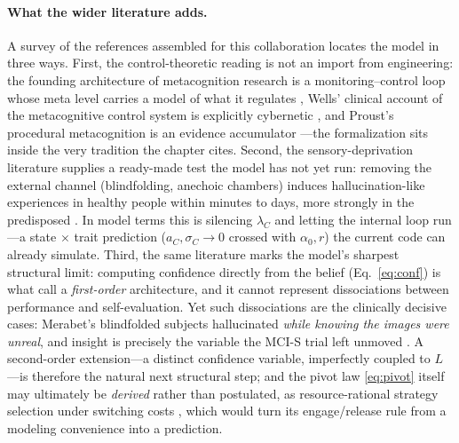 \documentclass[11pt]{article}
\begin{document}
\paragraph{What the wider literature adds.} A survey of the references assembled for this collaboration locates the model in three ways. First, the control-theoretic reading is not an import from engineering: the founding architecture of metacognition research is a monitoring--control loop whose meta level carries a model of what it regulates \citep{NelsonNarens1990, ConantAshby1970}, Wells' clinical account of the metacognitive control system is explicitly cybernetic \citep{Wells2019}, and Proust's procedural metacognition is an evidence accumulator \citep{Proust2012}---the formalization sits inside the very tradition the chapter cites. Second, the sensory-deprivation literature supplies a ready-made test the model has not yet run: removing the external channel (blindfolding, anechoic chambers) induces hallucination-like experiences in healthy people within minutes to days, more strongly in the predisposed \citep{Merabet2004, Daniel2014}. In model terms this is silencing $\lambda_C$ and letting the internal loop run---a state $\times$ trait prediction ($a_C,\sigma_C \to 0$ crossed with $\alpha_0, r$) the current code can already simulate. Third, the same literature marks the model's sharpest structural limit: computing confidence directly from the belief (Eq.~\eqref{eq:conf}) is what \citet{FlemingDaw2017} call a \emph{first-order} architecture, and it cannot represent dissociations between performance and self-evaluation. Yet such dissociations are the clinically decisive cases: Merabet's blindfolded subjects hallucinated \emph{while knowing the images were unreal}, and insight is precisely the variable the MCI-S trial left unmoved \citep{HanLee2022}. A second-order extension---a distinct confidence variable, imperfectly coupled to $L$---is therefore the natural next structural step; and the pivot law \eqref{eq:pivot} itself may ultimately be \emph{derived} rather than postulated, as resource-rational strategy selection under switching costs \citep{LiederGriffiths2017}, which would turn its engage/release rule from a modeling convenience into a prediction.
\end{document}
